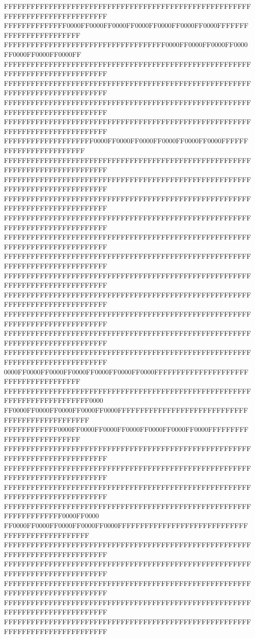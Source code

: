 FFFFFFFFFFFFFFFFFFFFFFFFFFFFFFFFFFFFFFFFFFFFFFFFFFFFFFFFFFFFFFFFFFFFFFFFFFFFFF
FFFFFFFFFFFFFF0000FF0000FF0000FF0000FF0000FF0000FF0000FFFFFFFFFFFFFFFFFFFFFFFF
FFFFFFFFFFFFFFFFFFFFFFFFFFFFFFFFFFFF0000FF0000FF0000FF0000FF0000FF0000FF0000FF
FFFFFFFFFFFFFFFFFFFFFFFFFFFFFFFFFFFFFFFFFFFFFFFFFFFFFFFFFFFFFFFFFFFFFFFFFFFFFF
FFFFFFFFFFFFFFFFFFFFFFFFFFFFFFFFFFFFFFFFFFFFFFFFFFFFFFFFFFFFFFFFFFFFFFFFFFFFFF
FFFFFFFFFFFFFFFFFFFFFFFFFFFFFFFFFFFFFFFFFFFFFFFFFFFFFFFFFFFFFFFFFFFFFFFFFFFFFF
FFFFFFFFFFFFFFFFFFFFFFFFFFFFFFFFFFFFFFFFFFFFFFFFFFFFFFFFFFFFFFFFFFFFFFFFFFFFFF
FFFFFFFFFFFFFFFFFFFF0000FF0000FF0000FF0000FF0000FF0000FFFFFFFFFFFFFFFFFFFFFFFF
FFFFFFFFFFFFFFFFFFFFFFFFFFFFFFFFFFFFFFFFFFFFFFFFFFFFFFFFFFFFFFFFFFFFFFFFFFFFFF
FFFFFFFFFFFFFFFFFFFFFFFFFFFFFFFFFFFFFFFFFFFFFFFFFFFFFFFFFFFFFFFFFFFFFFFFFFFFFF
FFFFFFFFFFFFFFFFFFFFFFFFFFFFFFFFFFFFFFFFFFFFFFFFFFFFFFFFFFFFFFFFFFFFFFFFFFFFFF
FFFFFFFFFFFFFFFFFFFFFFFFFFFFFFFFFFFFFFFFFFFFFFFFFFFFFFFFFFFFFFFFFFFFFFFFFFFFFF
FFFFFFFFFFFFFFFFFFFFFFFFFFFFFFFFFFFFFFFFFFFFFFFFFFFFFFFFFFFFFFFFFFFFFFFFFFFFFF
FFFFFFFFFFFFFFFFFFFFFFFFFFFFFFFFFFFFFFFFFFFFFFFFFFFFFFFFFFFFFFFFFFFFFFFFFFFFFF
FFFFFFFFFFFFFFFFFFFFFFFFFFFFFFFFFFFFFFFFFFFFFFFFFFFFFFFFFFFFFFFFFFFFFFFFFFFFFF
FFFFFFFFFFFFFFFFFFFFFFFFFFFFFFFFFFFFFFFFFFFFFFFFFFFFFFFFFFFFFFFFFFFFFFFFFFFFFF
FFFFFFFFFFFFFFFFFFFFFFFFFFFFFFFFFFFFFFFFFFFFFFFFFFFFFFFFFFFFFFFFFFFFFFFFFFFFFF
FFFFFFFFFFFFFFFFFFFFFFFFFFFFFFFFFFFFFFFFFFFFFFFFFFFFFFFFFFFFFFFFFFFFFFFFFFFFFF
FFFFFFFFFFFFFFFFFFFFFFFFFFFFFFFFFFFFFFFFFFFFFFFFFFFFFFFFFFFFFFFFFFFFFFFFFFFFFF
0000FF0000FF0000FF0000FF0000FF0000FF0000FFFFFFFFFFFFFFFFFFFFFFFFFFFFFFFFFFFFFF
FFFFFFFFFFFFFFFFFFFFFFFFFFFFFFFFFFFFFFFFFFFFFFFFFFFFFFFFFFFFFFFFFFFFFFFFFF0000
FF0000FF0000FF0000FF0000FF0000FFFFFFFFFFFFFFFFFFFFFFFFFFFFFFFFFFFFFFFFFFFFFFFF
FFFFFFFFFFFF0000FF0000FF0000FF0000FF0000FF0000FF0000FFFFFFFFFFFFFFFFFFFFFFFFFF
FFFFFFFFFFFFFFFFFFFFFFFFFFFFFFFFFFFFFFFFFFFFFFFFFFFFFFFFFFFFFFFFFFFFFFFFFFFFFF
FFFFFFFFFFFFFFFFFFFFFFFFFFFFFFFFFFFFFFFFFFFFFFFFFFFFFFFFFFFFFFFFFFFFFFFFFFFFFF
FFFFFFFFFFFFFFFFFFFFFFFFFFFFFFFFFFFFFFFFFFFFFFFFFFFFFFFFFFFFFFFFFFFFFFFFFFFFFF
FFFFFFFFFFFFFFFFFFFFFFFFFFFFFFFFFFFFFFFFFFFFFFFFFFFFFFFFFFFFFFFFFFFF0000FF0000
FF0000FF0000FF0000FF0000FF0000FFFFFFFFFFFFFFFFFFFFFFFFFFFFFFFFFFFFFFFFFFFFFFFF
FFFFFFFFFFFFFFFFFFFFFFFFFFFFFFFFFFFFFFFFFFFFFFFFFFFFFFFFFFFFFFFFFFFFFFFFFFFFFF
FFFFFFFFFFFFFFFFFFFFFFFFFFFFFFFFFFFFFFFFFFFFFFFFFFFFFFFFFFFFFFFFFFFFFFFFFFFFFF
FFFFFFFFFFFFFFFFFFFFFFFFFFFFFFFFFFFFFFFFFFFFFFFFFFFFFFFFFFFFFFFFFFFFFFFFFFFFFF
FFFFFFFFFFFFFFFFFFFFFFFFFFFFFFFFFFFFFFFFFFFFFFFFFFFFFFFFFFFFFFFFFFFFFFFFFFFFFF
FFFFFFFFFFFFFFFFFFFFFFFFFFFFFFFFFFFFFFFFFFFFFFFFFFFFFFFFFFFFFFFFFFFFFFFFFFFFFF
